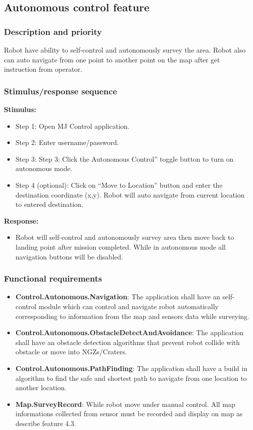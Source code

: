 \documentclass[10pt,a4paper,titlepage]{article}
\begin{document}
	
	\subsection{Autonomous control feature }
	\subsubsection{Description and priority}
	\text Robot have ability to self-control and autonomously survey the area. Robot also can auto navigate from one point to another point on the map after get instruction from operator.
	\subsubsection{Stimulus/response sequence}
	\textbf{Stimulus:}
	\begin{itemize}
		\item Step 1: Open MJ Control application.
		\item Step 2: Enter username/password.
		\item Step 3: Step 3: Click the Autonomous Control” toggle button to turn on autonomous mode.
		\item Step 4 (optional): Click on “Move to Location” button and enter the destination coordinate (x,y). Robot will auto navigate from current location to entered destination.
	\end{itemize}
	\textbf{Response:}
	\begin{itemize}
		\item Robot will self-control and autonomously survey area then move back to landing point after mission completed. While in autonomous mode all navigation buttons will be disabled.
	\end{itemize}
	\subsubsection{Functional requirements}
	\begin{itemize}
		\item \textbf{Control.Autonomous.Navigation}: The application shall have an self-control module which can control and navigate robot automatically corresponding to information from the map and sensors data while surveying.
		\item \textbf{Control.Autonomous.ObstacleDetectAndAvoidance}: The application shall have an obstacle detection algorithms that prevent robot collide with obstacle or move into NGZs/Craters.
		\item \textbf{Control.Autonomous.PathFinding}: The application shall have a build in algorithm to find the safe and shortest path to navigate from one location to another location.
		\item \textbf{Map.SurveyRecord}: While robot move under manual control. All map informations collected from sensor must be recorded and display on map as describe feature 4.3.
	\end{itemize}
 
\end{document}

